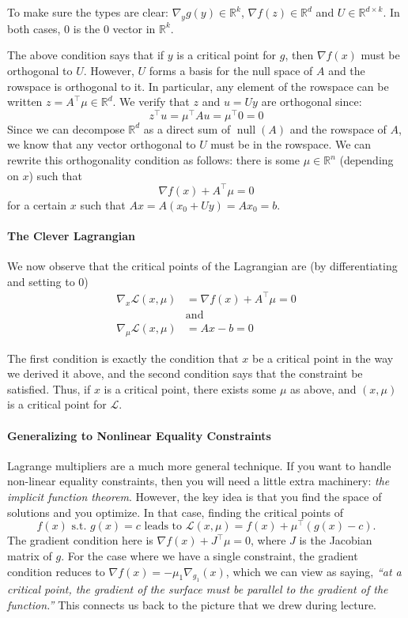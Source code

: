To make sure the types are clear: $\nabla_y g(y) \in \mathbb R^k$, $\nabla f(z) \in \mathbb R^d$ and $U \in \mathbb R^{d \times k}$.
In both cases, $0$ is the $0$ vector in $\mathbb R^k$.

The above condition says that if $y$ is a critical point for $g$, then $\nabla f(x)$ must
be orthogonal to $U$. However, $U$ forms a basis for the null space of $A$ and the
rowspace is orthogonal to it. In particular, any element of the rowspace can be
written $z = A^\top \mu \in \mathbb R^d$. We verify that $z$ and $u = Uy$ are orthogonal since:
\[
    z^\top u = \mu^\top Au = \mu^\top 0 = 0
\]
Since we can decompose $\mathbb R^d$ as a direct sum of $\operatorname{null}(A)$ and the rowspace of $A$, we
know that any vector orthogonal to $U$ must be in the rowspace. We can rewrite
this orthogonality condition as follows: there is some $\mu \in \mathbb R^n$ (depending on $x$)
such that
\[
    \nabla f(x) + A^\top \mu = 0
\]
for a certain $x$ such that $Ax = A(x_0 + Uy) = Ax_0 = b$.


\paragraph{The Clever Lagrangian} We now observe that the critical points of the
Lagrangian are (by differentiating and setting to $0$)
\begin{align*}
    \nabla_x \mathcal L(x,\mu) &= \nabla f(x) + A^\top \mu = 0\\
                               &\text{and}\\
    \nabla_\mu \mathcal L(x,\mu) &= Ax - b = 0
\end{align*}

The first condition is exactly the condition that $x$ be a critical point in the
way we derived it above, and the second condition says that the constraint be
satisfied. Thus, if $x$ is a critical point, there exists some $\mu$ as above, and $(x,\mu)$
is a critical point for $\mathcal L$.

\paragraph{Generalizing to Nonlinear Equality Constraints} Lagrange multipliers
are a much more general technique. If you want to handle non-linear equality
constraints, then you will need a little extra machinery: \textit{the implicit function
theorem}. However, the key idea is that you find the space of solutions and you
optimize. In that case, finding the critical points of
\[
    f(x) \text{ s.t. } g(x) = c \text{ leads to } \mathcal L(x,\mu) = f(x) + \mu^\top (g(x) - c).
\]
The gradient condition here is $\nabla f(x)+J^\top \mu = 0$, where $J$ is the Jacobian matrix
of $g$. For the case where we have a single constraint, the gradient condition
reduces to $\nabla f(x) = -\mu_1 \nabla_{g_1}(x)$, which we can view as saying, \textit{``at a critical
point, the gradient of the surface must be parallel to the gradient of the function.''}
This connects us back to the picture that we drew during lecture.

